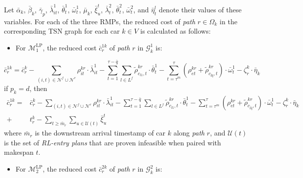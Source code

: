 \documentclass[12pt]{article}
\begin{document}
\vspace{+2mm}

Let $\bar{\alpha}_k$, $\bar{\beta}_k$, $\bar{\gamma}_p$, $\bar{\lambda}^1_{it}$, $\bar{\theta}^1_t$, $\bar{\omega}^1_t$, $\bar{\mu}_k$, $\bar{\xi}^{t}_{u}$, $\bar{\lambda}^2_t$, $\bar{\theta}^2_t$, $\bar{\omega}^2_t$, and $\bar{\eta}^{l}_{t}$ denote their values of these variables. For each of the three RMPs, the reduced cost of \textit{path} $r\in \Omega_k$ in the corresponding TSN graph for each car $k\in V$ is calculated as follows:
\begin{itemize}[topsep = 0.4pt, itemsep = 0.8pt, parsep = 0pt, labelwidth=0pt, leftmargin=*]
    \item For $\mathcal{M}^{\text{LP}}_1$, the reduced cost $\bar{c}^{1k}_r$ of \textit{path} $r$ in $\mathcal{G}^1_k$ is:
\end{itemize}
\begin{equation}\label{rc1}
        \bar{c}^{1k}_r=%
        \bar{c}^k_r -\sum_{(i,t)\in \mathcal{N}^{f}\cup \mathcal{N}^{r}}{\rho^{kr}_{it}\cdot \bar{\lambda}^1_{it}} - \sum_{t=1}^{\tau-\bar{q}}{\sum_{l\in L^f}{\tilde{\rho}^{kr}_{c_{l1},t}\cdot \bar{\theta}^1_t}} - \sum_{t=\tau^m}^{\tau}{(\rho^{kr}_{et}+\tilde{\rho}^{kr}_{c_{\bar{l}\bar{q}},t})\cdot \bar{\omega}^1_t} -\zeta^k_r\cdot \bar{\eta}_k%
\end{equation}
\noindent if $p_k=d$, then
\begin{align}\label{rc1-1}
    \bar{c}^{1k}_r= &\bar{c}^k_r -\sum_{(i,t)\in \mathcal{N}^{f}\cup \mathcal{N}^{r}}{\rho^{kr}_{it}\cdot \bar{\lambda}^1_{it}} - \sum_{t=1}^{\tau-\bar{q}}{\sum_{l\in L^f}{\tilde{\rho}^{kr}_{c_{l1},t}\cdot \bar{\theta}^1_t}} - \sum_{t=\tau^m}^{\tau}{(\rho^{kr}_{et}+\tilde{\rho}^{kr}_{c_{\bar{l}\bar{q}},t})\cdot \bar{\omega}^1_t} -\zeta^k_r\cdot \bar{\eta}_k\nonumber \\
    +&t^k_r-\sum_{t\geqslant \bar{m}_r}{\sum_{u\in \mathcal{U}(t)}{\bar{\xi}^{t}_u}}
\end{align}
where $\bar{m}_r$ is the downstream arrival timestamp of car $k$ along \textit{path} $r$, and $\mathcal{U}(t)$ is the set of \textit{RL-entry plans} that are proven infeasible when paired with makespan $t$.
\begin{itemize}[topsep = 0.4pt, itemsep = 0.8pt, parsep = 0pt, labelwidth=0pt, leftmargin=*]
    \item For $\mathcal{M}^{\text{LP}}_2$, the reduced cost $\bar{c}^{2k}_r$ of \textit{path} $r$ in $\mathcal{G}^2_k$ is:
\end{itemize}
\end{document}
